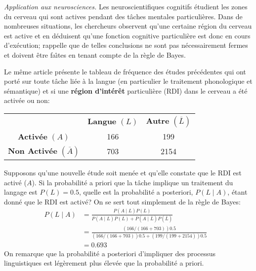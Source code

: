 \begin{Exemple}
\textit{Application aux neurosciences.}
Les neuroscientifiques cognitifs étudient les zones du cerveau qui sont actives pendant des tâches mentales particulières. Dans de nombreuses situations, les chercheurs observent qu'une certaine région du cerveau est active et en déduisent qu'une fonction cognitive particulière est donc en cours d'exécution; \cite{BDA_Poldrack} rappelle que de telles conclusions ne sont pas nécessairement fermes et doivent être fa\^{\i}tes en tenant compte de la règle de Bayes. \par Le même article présente le tableau de fréquence des études précédentes qui ont porté sur toute tâche liée à la langue (en particulier le traitement phonologique et sémantique) et si une \textbf{région d'intérêt} particulière (RDI) dans le cerveau a été activée ou non:

\begin{center}
 \begin{tabular}{ccc} 
 $ $& \textbf{\textrm{Langue}} $(L)$& \textbf{Autre} $(\overline{L})$\\ [0.5ex] 
 \textbf{Activée} $(A)$ & 166 & 199  \\ 
  \textbf{Non Activée} $(\overline{A})$ & 703 & 2154 \\ [1ex] 
\end{tabular}
\end{center}
Supposons qu'une nouvelle étude soit menée et qu'elle constate que le RDI est activé  ($A$). Si la probabilité a priori que la tâche implique un traitement du langage est $P(L)=0.5$, quelle est la probabilité a posteriori, $P(L\mid A)$, étant donné que le RDI est activé?
\newl On se sert tout simplement de la r\`egle de Bayes: 
\begin{equation*}
\begin{aligned}
P(L\mid A)&= \frac{P(A\mid L) P(L)}{P(A\mid L) P(L) + P(A \mid  \overline{L}) P(\overline{L}) }& \\
                     &= \frac{(166/(166+703))0.5}{(166/(166+703))0.5 + (199/(199+2154))0.5 } & \\
				&= 0.693 &
\end{aligned}
\end{equation*}
On remarque que la probabilité a posteriori d'impliquer des processus linguistiques est légèrement plus élevée que la probabilité a priori.
\end{Exemple}

